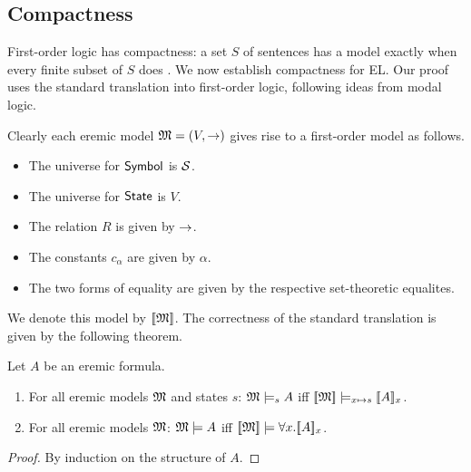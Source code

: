 \subsection{Compactness}

First-order logic has compactness: a set $S$ of sentences has a model
exactly when every finite subset of $S$ does \cite[Chapter
  4.3]{EndertonHB:matinttl}. We now establish compactness for EL. Our
proof uses the standard translation into first-order logic, following
ideas from modal logic.



\NI Clearly each eremic model $\frak{M} = (V, \rightarrow)$ gives rise to a
first-order model as follows.

\begin{itemize}

\item The universe for $\mathsf{Symbol}$ is $\mathcal{S}$.

\item The universe for $\mathsf{State}$ is $V$.

\item The relation $R$ is given by $\rightarrow$.

\item The constants $c_{\alpha}$ are given by $\alpha$.

\item The two forms of equality are given by the respective
  set-theoretic equalites.

\end{itemize}

\NI We denote this model by $\lbrack\!\lbrack \frak{M} \rbrack\!\rbrack$. The correctness of the
standard translation is given by the following theorem.

\begin{theorem}\label{correspondence:theorem}
Let $A$ be an eremic formula.
\begin{enumerate}

\item For all eremic models $\frak{M}$ and states $s$: $\frak{M} \models_s A$
  iff $\lbrack\!\lbrack \frak{M} \rbrack\!\rbrack \models_{x \mapsto s} \lbrack\!\lbrack A \rbrack\!\rbrack_x$.

\item For all eremic models $\frak{M}$: $\frak{M} \models A$ iff $\lbrack\!\lbrack \frak{M} \rbrack\!\rbrack
  \models \forall x.\lbrack\!\lbrack A \rbrack\!\rbrack_x$.

\end{enumerate}
\end{theorem}
\begin{proof}
By induction on the structure of $A$.
\end{proof}


